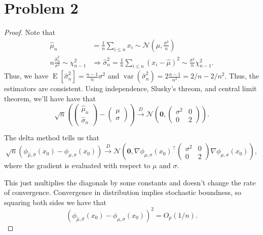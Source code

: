 \documentclass[letterpaper]{article}
\DeclareMathOperator{\E}{E}
\begin{document}
\section*{Problem 2}
\begin{proof}
  Note that
  \begin{align*}
    \hat{\mu}_n
    &= \frac{1}{n}\sum_{i \leq n}x_i \sim \mathcal{N}\left(\mu, \frac{\sigma^2}{n}\right) \\
    n\frac{\hat{\sigma}^2_n}{\sigma^2} \sim \chi^2_{n-1}
    &\Rightarrow
      \hat{\sigma}^2_n
      = \frac{1}{n}\sum_{i \leq n}\left(x_i - \hat{\mu}\right)^2
      \sim \frac{\sigma^2}{n}\chi^2_{n-1}.
  \end{align*}
  Thus, we have $\E\left[\hat{\sigma}^2_n\right] = \frac{n-1}{n}\sigma^2$ and
  $\operatorname{var}\left(\hat{\sigma}^2_n\right) = 2\frac{n-1}{n^2} = 2/n -
  2/n^2$. Thus, the estimators are consistent. Using independence, Slusky's
  threom, and central limit theorem, we'll have have that
  \begin{equation*}
    \sqrt{n}\left(\begin{pmatrix}
      \hat{\mu}_n \\
      \hat{\sigma}_n
    \end{pmatrix} - \begin{pmatrix}
      \mu \\
      \sigma
    \end{pmatrix}\right)
  \xrightarrow{D}
  \mathcal{N}\left(
    \mathbf{0},
    \begin{pmatrix}
      \sigma^2 & 0 \\
      0 & 2
    \end{pmatrix}
  \right).
\end{equation*}

The delta method tells us that
  \begin{equation*}
    \sqrt{n}\left(
      \phi_{\hat{\mu},\hat{\sigma}}(x_0) - \phi_{\mu,\sigma}(x_0)
    \right)
  \xrightarrow{D}
  \mathcal{N}\left(
    \mathbf{0},
    \nabla\phi_{\mu,\sigma}(x_0)^\top
    \begin{pmatrix}
      \sigma^2 & 0 \\
      0 & 2
    \end{pmatrix}
    \nabla\phi_{\mu,\sigma}(x_0)
  \right),
\end{equation*}
where the gradient is evaluated with respect to $\mu$ and $\sigma$.

This just multiplies the diagonals by some constants and doesn't change the rate
of convergence. Convergence in distribution implies stochastic boundness, so
squaring both sides we have that
\begin{equation*}
  \left(\phi_{\hat{\mu},\hat{\sigma}}(x_0) - \phi_{\mu,\sigma}(x_0)\right)^2
  = O_p\left(1/n\right).
\end{equation*}
\end{proof}
\end{document}
